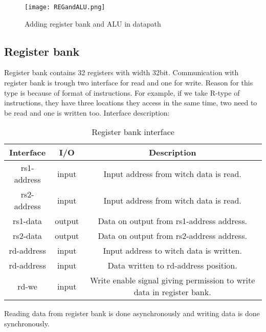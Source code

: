 \documentclass{scrreprt}
\begin{document}
\begin{figure}[htb!]
    \centering
    \texttt{[image: REGandALU.png]}
    \caption{Adding register bank and ALU in datapath}
    \label{fig:regandalu}
\end{figure}
\newpage
\subsection*{Register bank}

Register bank contains 32 registers with width 32bit. Communication with register bank is trough two interface for read and one for write. Reason for this type is because of format of instructions. For example, if we take R-type of instructions, they have three locations they access in the same time, two need to be read and one is written too. 
Interface description: 
    \begin{table}[ht]
        \centering
        \begin{tabular}{|c|c|c|} \hline 
             Interface & I/O & Description \\ \hline  
             rs1-address & input & Input address from witch data is read. \\ \hline  
             rs2-address & input & Input address from witch data is read.  \\ \hline
             rs1-data & output & Data on output from rs1-address address. \\ \hline
             rs2-data & output & Data on output from rs2-address address. \\ \hline
             rd-address & input & Input address to witch data is written.  \\ \hline
             rd-address & input & Data written to rd-address position.  \\ \hline
             rd-we & input & Write enable signal giving permission to write data in register bank.  \\ \hline
        \end{tabular}
        \caption{Register bank interface}
        \label{tab:Reg interface}
    \end{table}
    \hfill \break
Reading data from register bank is done asynchronously and writing data is done synchronously. 
\end{document}
